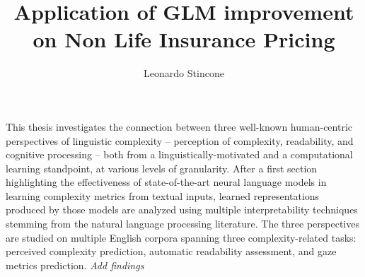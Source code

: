 \documentclass[a4paper, nobind]{templates/ociamthesis}
\title{Application of GLM improvement on Non Life Insurance Pricing}
\author{Leonardo Stincone}
\begin{document}
\setlength{\textbaselineskip}{18pt plus2pt}

\setlength{\frontmatterbaselineskip}{16pt plus1pt minus1pt}

\setlength{\abstractseparatelineskip}{13pt plus1pt minus1pt}
\setlength{\abstractseparateparskip}{0pt plus 1pt}

\setlength{\parskip}{2pt plus 1pt}


\setlength{\baselineskip}{\textbaselineskip}



\setcounter{secnumdepth}{3}
\setcounter{tocdepth}{3}


\begin{abstractseparate}
  This thesis investigates the connection between three well-known human-centric perspectives of linguistic complexity -- perception of complexity, readability, and cognitive processing -- both from a linguistically-motivated and a computational learning standpoint, at various levels of granularity. After a first section highlighting the effectiveness of state-of-the-art neural language models in learning complexity metrics from textual inputs, learned representations produced by those models are analyzed using multiple interpretability techniques stemming from the natural language processing literature. The three perspectives are studied on multiple English corpora spanning three complexity-related tasks: perceived complexity prediction, automatic readability assessment, and gaze metrics prediction. \emph{Add findings}
\end{abstractseparate}
\end{document}
